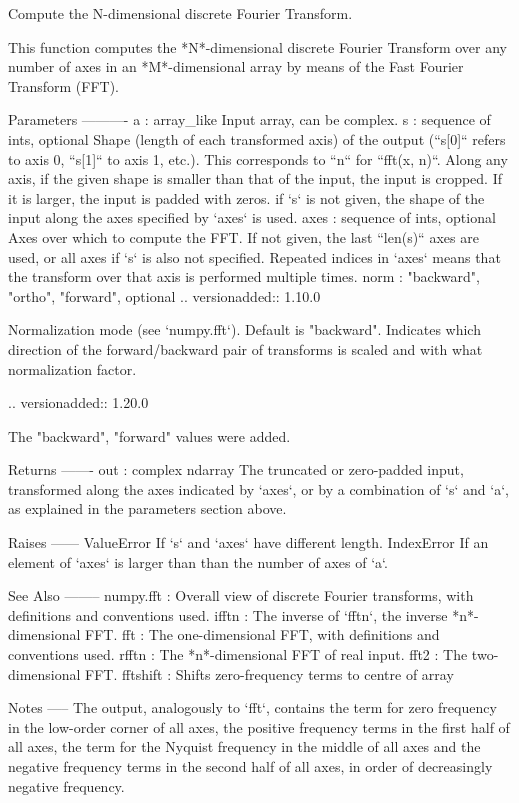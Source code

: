 \begin{DoxyVerb}Compute the N-dimensional discrete Fourier Transform.

This function computes the *N*-dimensional discrete Fourier Transform over
any number of axes in an *M*-dimensional array by means of the Fast Fourier
Transform (FFT).

Parameters
----------
a : array_like
    Input array, can be complex.
s : sequence of ints, optional
    Shape (length of each transformed axis) of the output
    (``s[0]`` refers to axis 0, ``s[1]`` to axis 1, etc.).
    This corresponds to ``n`` for ``fft(x, n)``.
    Along any axis, if the given shape is smaller than that of the input,
    the input is cropped.  If it is larger, the input is padded with zeros.
    if `s` is not given, the shape of the input along the axes specified
    by `axes` is used.
axes : sequence of ints, optional
    Axes over which to compute the FFT.  If not given, the last ``len(s)``
    axes are used, or all axes if `s` is also not specified.
    Repeated indices in `axes` means that the transform over that axis is
    performed multiple times.
norm : {"backward", "ortho", "forward"}, optional
    .. versionadded:: 1.10.0

    Normalization mode (see `numpy.fft`). Default is "backward".
    Indicates which direction of the forward/backward pair of transforms
    is scaled and with what normalization factor.

    .. versionadded:: 1.20.0

        The "backward", "forward" values were added.

Returns
-------
out : complex ndarray
    The truncated or zero-padded input, transformed along the axes
    indicated by `axes`, or by a combination of `s` and `a`,
    as explained in the parameters section above.

Raises
------
ValueError
    If `s` and `axes` have different length.
IndexError
    If an element of `axes` is larger than than the number of axes of `a`.

See Also
--------
numpy.fft : Overall view of discrete Fourier transforms, with definitions
    and conventions used.
ifftn : The inverse of `fftn`, the inverse *n*-dimensional FFT.
fft : The one-dimensional FFT, with definitions and conventions used.
rfftn : The *n*-dimensional FFT of real input.
fft2 : The two-dimensional FFT.
fftshift : Shifts zero-frequency terms to centre of array

Notes
-----
The output, analogously to `fft`, contains the term for zero frequency in
the low-order corner of all axes, the positive frequency terms in the
first half of all axes, the term for the Nyquist frequency in the middle
of all axes and the negative frequency terms in the second half of all
axes, in order of decreasingly negative frequency.


\end{DoxyVerb}
